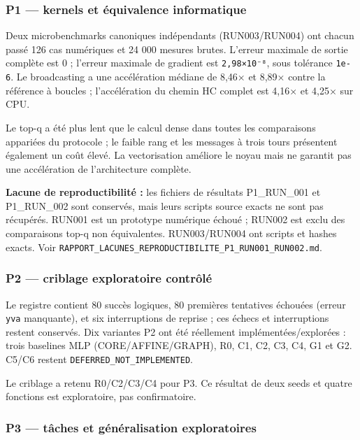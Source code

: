\documentclass[
]{article}
\begin{document}
\subsubsection{P1 --- kernels et équivalence
informatique}\label{p1-kernels-et-uxe9quivalence-informatique}

Deux microbenchmarks canoniques indépendants (RUN003/RUN004) ont chacun
passé 126 cas numériques et 24 000 mesures brutes. L'erreur maximale de
sortie complète est 0 ; l'erreur maximale de gradient est
\texttt{2,98×10⁻⁸}, sous tolérance \texttt{1e-6}. Le broadcasting a une
accélération médiane de 8,46× et 8,89× contre la référence à boucles ;
l'accélération du chemin HC complet est 4,16× et 4,25× sur CPU.

Le top-q a été plus lent que le calcul dense dans toutes les
comparaisons appariées du protocole ; le faible rang et les messages à
trois tours présentent également un coût élevé. La vectorisation
améliore le noyau mais ne garantit pas une accélération de
l'architecture complète.

\textbf{Lacune de reproductibilité :} les fichiers de résultats
P1\_RUN\_001 et P1\_RUN\_002 sont conservés, mais leurs scripts source
exacts ne sont pas récupérés. RUN001 est un prototype numérique échoué ;
RUN002 est exclu des comparaisons top-q non équivalentes. RUN003/RUN004
ont scripts et hashes exacts. Voir
\texttt{RAPPORT\_LACUNES\_REPRODUCTIBILITE\_P1\_RUN001\_RUN002.md}.

\subsubsection{P2 --- criblage exploratoire
contrôlé}\label{p2-criblage-exploratoire-contruxf4luxe9}

Le registre contient 80 succès logiques, 80 premières tentatives
échouées (erreur \texttt{yva} manquante), et six interruptions de
reprise ; ces échecs et interruptions restent conservés. Dix variantes
P2 ont été réellement implémentées/explorées : trois baselines MLP
(CORE/AFFINE/GRAPH), R0, C1, C2, C3, C4, G1 et G2. C5/C6 restent
\texttt{DEFERRED\_NOT\_IMPLEMENTED}.

Le criblage a retenu R0/C2/C3/C4 pour P3. Ce résultat de deux seeds et
quatre fonctions est exploratoire, pas confirmatoire.

\subsubsection{P3 --- tâches et généralisation
exploratoires}\label{p3-tuxe2ches-et-guxe9nuxe9ralisation-exploratoires}
\end{document}
